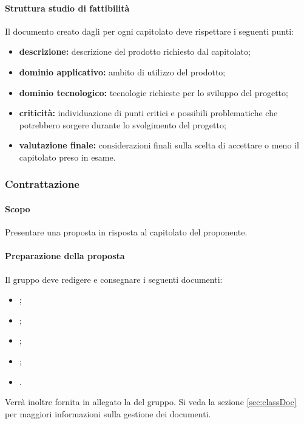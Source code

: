             \paragraph{Struttura studio di fattibilità}
            Il documento creato dagli \analisti{} per ogni capitolato deve rispettare i seguenti punti:
            \begin{itemize}
                \item \textbf{descrizione:} descrizione del prodotto richiesto dal capitolato;
                \item \textbf{dominio applicativo:} ambito di utilizzo del prodotto;
                \item \textbf{dominio tecnologico:} tecnologie richieste per lo sviluppo del progetto;
                \item \textbf{criticità:} individuazione di punti critici e possibili problematiche che potrebbero sorgere durante lo svolgimento del progetto;
                \item \textbf{valutazione finale:} considerazioni finali sulla scelta di accettare o meno il capitolato preso in esame.
            \end{itemize}
        \subsubsection{Contrattazione}
            \paragraph{Scopo}
            Presentare una proposta in risposta al capitolato del proponente.
            \paragraph{Preparazione della proposta}
            Il gruppo deve redigere e consegnare i seguenti documenti:
            \begin{itemize}
                \item \ndp;
                \item \sdf;
                \item \adr;
                \item \pdp;
                \item \pdq.
            \end{itemize}
            Verrà inoltre fornita in allegato la \ldp{} del gruppo. Si veda la sezione \ref{sec:classDoc} per maggiori informazioni sulla gestione dei documenti.
